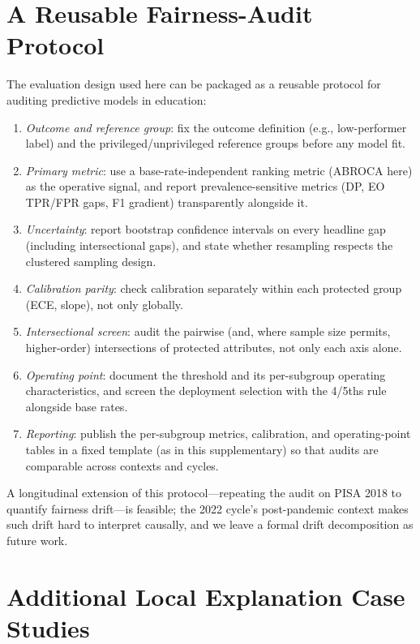 \documentclass[journal]{IEEEtran}
\begin{document}
\section{A Reusable Fairness-Audit Protocol}
\label{sec:s8}

The evaluation design used here can be packaged as a reusable protocol for auditing predictive models in education:
\begin{enumerate}
\item \emph{Outcome and reference group}: fix the outcome definition (e.g., low-performer label) and the privileged/unprivileged reference groups before any model fit.
\item \emph{Primary metric}: use a base-rate-independent ranking metric (ABROCA here) as the operative signal, and report prevalence-sensitive metrics (DP, EO TPR/FPR gaps, F1 gradient) transparently alongside it.
\item \emph{Uncertainty}: report bootstrap confidence intervals on every headline gap (including intersectional gaps), and state whether resampling respects the clustered sampling design.
\item \emph{Calibration parity}: check calibration separately within each protected group (ECE, slope), not only globally.
\item \emph{Intersectional screen}: audit the pairwise (and, where sample size permits, higher-order) intersections of protected attributes, not only each axis alone.
\item \emph{Operating point}: document the threshold and its per-subgroup operating characteristics, and screen the deployment selection with the 4/5ths rule alongside base rates.
\item \emph{Reporting}: publish the per-subgroup metrics, calibration, and operating-point tables in a fixed template (as in this supplementary) so that audits are comparable across contexts and cycles.
\end{enumerate}
A longitudinal extension of this protocol---repeating the audit on PISA 2018 to quantify fairness drift---is feasible; the 2022 cycle's post-pandemic context makes such drift hard to interpret causally, and we leave a formal drift decomposition as future work.

\section{Additional Local Explanation Case Studies}
\label{sec:s9}
\end{document}
